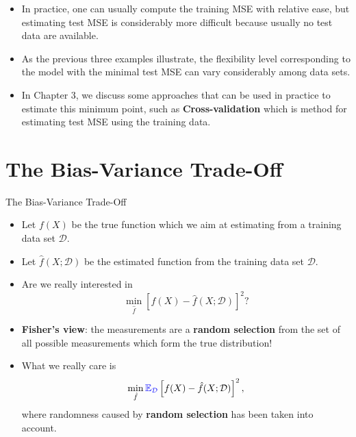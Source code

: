 \documentclass[10pt,a4paper]{beamer}
\begin{document}
\begin{frame}{}

\begin{itemize}
  \item In practice, one can usually compute the training MSE with relative
ease, but estimating test MSE is considerably more difficult because usually
no test data are available.
  \item As the previous three examples illustrate, the
flexibility level corresponding to the model with the minimal test MSE can
vary considerably among data sets.
  \item In Chapter 3, we discuss some approaches that can be used in practice to estimate this minimum point, such as \textbf{Cross-validation} which is
method for estimating test MSE using the training data.
\end{itemize}

\end{frame}


\section{The Bias-Variance Trade-Off}
\begin{frame}{The Bias-Variance Trade-Off}

\begin{itemize}
  \item Let $f(X)$ be the true function which we aim at estimating from a training data set $\mathcal{D}$.
  \item Let $\hat{f}(X;\mathcal{D})$ be the estimated function from the training data set $\mathcal{D}$.
  \item Are we really interested in
  \begin{equation}\label{}
    \min_{\hat{f}} \left[f(X) - \hat{f}(X;\mathcal{D})\right]^2?
  \end{equation}
  \item \textbf{Fisher's view}: the measurements are a \textbf{random selection} from the set of all
possible measurements which form the true distribution!
\item What we really care is
  \begin{equation}\label{}
    \min_{\hat{f}} {\color{blue}{\mathbb{E}_{\mathcal{D}}}}\left[f(X) - \hat{f}(X;\mathcal{D})\right]^2,
  \end{equation}
where randomness caused by \textbf{random selection} has been taken into account.
\end{itemize}

\end{frame}
\end{document}
